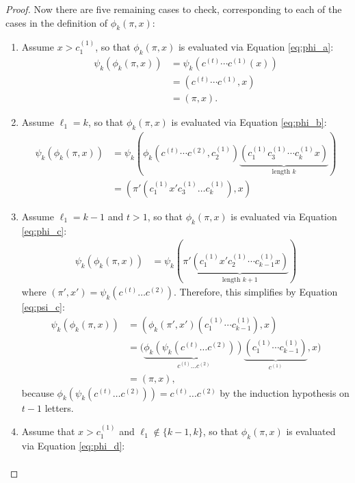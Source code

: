 \begin{proof}
  Now there are five remaining cases to check, corresponding to each of the
  cases in the definition of $\phi_k(\pi, x)$:
   \begin{enumerate}[leftmargin=*, label={\textbf{Case \arabic*.}}]
    \item Assume $x > c_1^{(1)}$, so that $\phi_k(\pi,x)$ is evaluated via Equation \eqref{eq:phi_a}: \begin{align}
      \psi_k(\phi_k(\pi, x))
      &= \psi_k(c^{(t)}\cdots c^{(1)}(x)) \\
      &= (c^{(t)}\cdots c^{(1)},x) \\
      &= (\pi, x).
    \end{align}
    \item Assume $\ell_1 = k$, so that $\phi_k(\pi,x)$ is evaluated via Equation \eqref{eq:phi_b}:\begin{align}
      \psi_k(\phi_k(\pi, x))
      &= \psi_k(\phi_k(c^{(t)} \cdots c^{(2)}, c^{(1)}_2)
      \underbrace{
        (c^{(1)}_1 c^{(1)}_3 \cdots c^{(1)}_{k} x)
      }_{\text{length } k}) \\
      &= (\pi'(c^{(1)}_1x'c^{(1)}_3 \dots c^{(1)}_k), x)
    \end{align}
    \item Assume $\ell_1 = k - 1$ and $t > 1$, so that $\phi_k(\pi,x)$ is evaluated via Equation \eqref{eq:phi_c}:  \begin{align}
      \psi_k(\phi_k(\pi, x))
      &= \psi_k(\pi'
        \underbrace{
          (c^{(1)}_1 x' c^{(1)}_2\cdots c^{(1)}_{k-1} x)
        }_{\text{length } k + 1}
      )
    \end{align} where $(\pi', x') = \psi_k(c^{(t)} \dots c^{(2)})$.
    Therefore, this simplifies by Equation \eqref{eq:psi_c}: \begin{align}
      \psi_k(\phi_k(\pi, x)) &= \left(
        \phi_k(\pi', x')
        (c^{(1)}_1 \cdots c^{(1)}_{k-1}),
        x
      \right) \\
      &= \Big(
        \underbrace{
          \phi_k(\psi_k(c^{(t)} \dots c^{(2)}))
        }_{c^{(t)} \dots c^{(2)}}
        \underbrace{
          (c^{(1)}_1 \cdots c^{(1)}_{k-1})
        }_{c^{(1)}},
        x
      \Big) \\
      &= (\pi, x),
    \end{align} because $\phi_k(\psi_k(c^{(t)} \dots c^{(2)})) = c^{(t)} \dots c^{(2)}$
    by the induction hypothesis on $t-1$ letters.
    \item Assume that $x > c_1^{(1)}$ and $\ell_1 \not\in \{k-1,k\}$, so that $\phi_k(\pi,x)$ is evaluated via Equation \eqref{eq:phi_d}: \begin{align}

\end{align}
\end{enumerate}
\end{proof}
